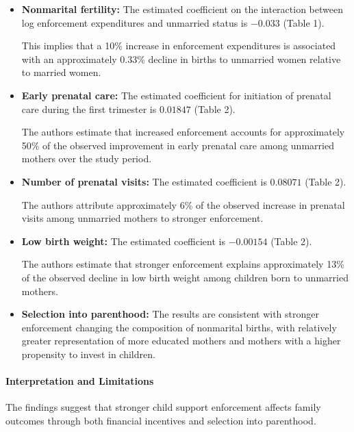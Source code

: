\documentclass{article}
\begin{document}
\begin{itemize}

    \item \textbf{Nonmarital fertility:}
    The estimated coefficient on the interaction
    between log enforcement expenditures and
    unmarried status is $-0.033$ (Table 1).

    This implies that a 10\% increase in
    enforcement expenditures is associated
    with an approximately 0.33\% decline
    in births to unmarried women relative
    to married women.

    \item \textbf{Early prenatal care:}
    The estimated coefficient for initiation
    of prenatal care during the first trimester
    is $0.01847$ (Table 2).

    The authors estimate that increased
    enforcement accounts for approximately
    50\% of the observed improvement in
    early prenatal care among unmarried
    mothers over the study period.

    \item \textbf{Number of prenatal visits:}
    The estimated coefficient is $0.08071$
    (Table 2).

    The authors attribute approximately
    6\% of the observed increase in prenatal
    visits among unmarried mothers to
    stronger enforcement.

    \item \textbf{Low birth weight:}
    The estimated coefficient is $-0.00154$
    (Table 2).

    The authors estimate that stronger
    enforcement explains approximately
    13\% of the observed decline in
    low birth weight among children
    born to unmarried mothers.

    \item \textbf{Selection into parenthood:}
    The results are consistent with stronger
    enforcement changing the composition
    of nonmarital births, with relatively
    greater representation of more educated
    mothers and mothers with a higher
    propensity to invest in children.

\end{itemize}

\paragraph{Interpretation and Limitations}

The findings suggest that stronger child support
enforcement affects family outcomes through
both financial incentives and selection into
parenthood.
\end{document}
